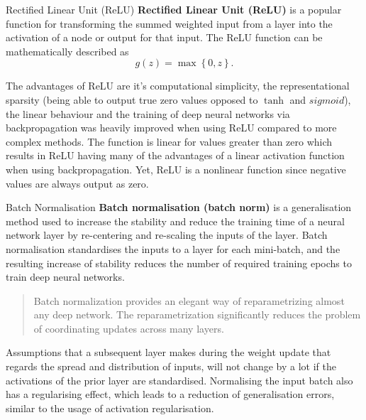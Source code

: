  \begin{pabox}{Rectified Linear Unit (ReLU)}
  \label{def:relu-definition}
    \textbf{Rectified Linear Unit (ReLU)} is a popular function for transforming the summed weighted input from a layer into the activation of a node or output for that input.
    The ReLU function can be mathematically described as $$g(z) = \max \left\{0, z\right\}.$$

    The advantages of ReLU are it's computational simplicity, the representational sparsity (being able to output true zero values opposed to $\tanh$ and $sigmoid$), the linear behaviour and the training of deep neural networks via backpropagation was heavily improved when using ReLU compared to more complex methods. The function is linear for values greater than zero which results in ReLU having many of the advantages of a linear activation function when using backpropagation. Yet, ReLU is a nonlinear function since negative values are always output as zero.
  \end{pabox}

  \begin{pabox}{Batch Normalisation}
  \label{def:batch-normalisation-definition}
    \textbf{Batch normalisation (batch norm)} is a generalisation method used to increase the stability and reduce the training time of a neural network layer by re-centering and re-scaling the inputs of the layer.
    Batch normalisation standardises the inputs to a layer for each mini-batch, and the resulting increase of stability reduces the number of required training epochs to train deep neural networks.

    \begin{quote}
      Batch normalization provides an elegant way of reparametrizing almost any deep network. 
      The reparametrization significantly reduces the problem of coordinating updates across many layers.
      \cite{goodfellowDeepLearning2016}
    \end{quote}
    Assumptions that a subsequent layer makes during the weight update that regards the spread and distribution of inputs, will not change by a lot if the activations of the prior layer are standardised. 
    Normalising the input batch also has a regularising effect, which leads to a reduction of generalisation errors, similar to the usage of activation regularisation.

  \end{pabox}

